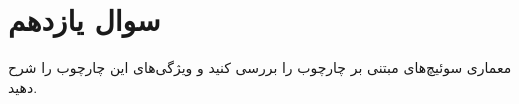 \section{سوال یازدهم}

معماری سوئیچ‌های مبتنی بر چارچوب  را بررسی کنید و ویژگی‌های این چارچوب را شرح دهید.